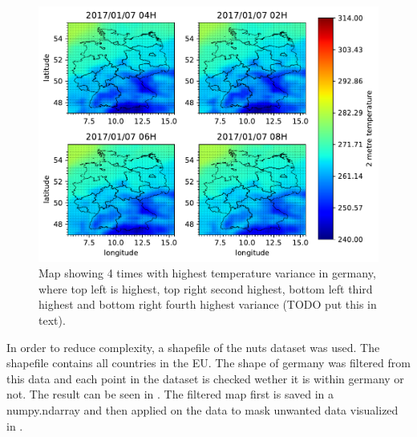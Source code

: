 \begin{figure}[h!]%
\centering
\includegraphics[width=\textwidth]{plots/t2m/bundles/maxvar4_maps}%
\caption{Map showing 4 times with highest temperature variance in germany, where top left is highest, top right second highest, bottom left third highest and bottom right fourth highest variance (TODO put this in text).}%
\label{fig:maxvar4_maps}%
\end{figure}

In order to reduce complexity, a shapefile of the \acrshort{nuts} dataset was used. The shapefile contains all countries in the EU. The shape of germany was filtered from this data and each point in the dataset is checked wether it is within germany or not. The result can be seen in . The filtered map first is saved in a numpy.ndarray and then applied on the data to mask unwanted data visualized in .\\

